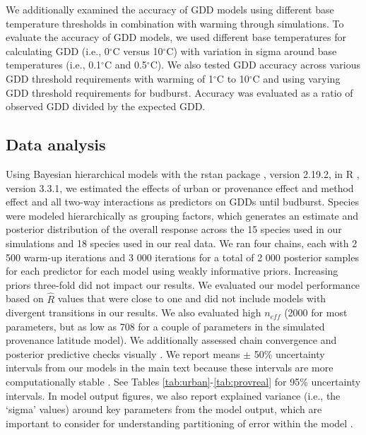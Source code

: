 \documentclass{article}\usepackage[]{graphicx}\usepackage[]{color}
\begin{document}
We additionally examined the accuracy of GDD models using different base temperature thresholds in combination with warming through simulations. To evaluate the accuracy of GDD models, we used different base temperatures for calculating GDD (i.e., 0$^{\circ}$C versus 10$^{\circ}$C) with variation in sigma around base temperatures (i.e., 0.1$^{\circ}$C and 0.5$^{\circ}$C). We also tested GDD accuracy across various GDD threshold requirements with warming of 1$^{\circ}$C to 10$^{\circ}$C and using varying GDD threshold requirements for budburst. Accuracy was evaluated as a ratio of observed GDD divided by the expected GDD.

\subsection*{Data analysis}
Using Bayesian hierarchical models with the rstan package \citep{rstan2019}, version 2.19.2,  in R \citep{R}, version 3.3.1, we estimated the effects of urban or provenance effect and method effect and all two-way interactions as predictors on GDDs until budburst. Species were modeled hierarchically as grouping factors, which generates an estimate and posterior distribution of the overall response across the 15 species used in our simulations and 18 species used in our real data. We ran four chains, each with 2 500 warm-up iterations and 3 000 iterations for a total of 2 000 posterior samples for each predictor for each model using weakly informative priors. Increasing priors three-fold did not impact our results. We evaluated our model performance based on $\hat{R}$ values that were close to one and did not include models with divergent transitions in our results. We also evaluated high $n_{eff}$ (2000 for most parameters, but as low as 708 for a couple of parameters in the simulated provenance latitude model). We additionally assessed chain convergence and posterior predictive checks visually \citep{BDA}. We report means $\pm$ 50\% uncertainty intervals from our models in the main text because these intervals are more computationally stable \citep{Carpenter2017,BDA}. See Tables \ref{tab:urban}-\ref{tab:provreal} for 95\% uncertainty intervals. In model output figures, we also report explained variance (i.e., the `sigma' values) around key parameters from the model output, which are important to consider for understanding partitioning of error within the model \citep{BDA}.
\end{document}
